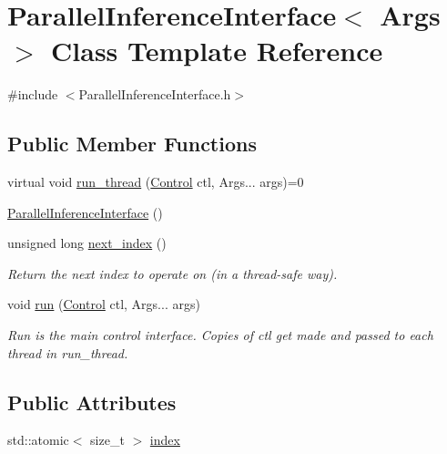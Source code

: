\hypertarget{class_parallel_inference_interface}{}\section{Parallel\+Inference\+Interface$<$ Args $>$ Class Template Reference}
\label{class_parallel_inference_interface}


{\ttfamily \#include $<$Parallel\+Inference\+Interface.\+h$>$}

\subsection*{Public Member Functions}
\begin{DoxyCompactItemize}
\item 
virtual void \hyperlink{class_parallel_inference_interface_a79f626a400fbc11ed530c97f32dfd5c3}{run\+\_\+thread} (\hyperlink{struct_control}{Control} ctl, Args... args)=0
\item 
\hyperlink{class_parallel_inference_interface_a59989833c3d7fde08746087b29c7dcef}{Parallel\+Inference\+Interface} ()
\item 
unsigned long \hyperlink{class_parallel_inference_interface_aaa1fe948131956b21a89c8c267e46b6c}{next\+\_\+index} ()
\begin{DoxyCompactList}\small\item\em Return the next index to operate on (in a thread-\/safe way). \end{DoxyCompactList}\item 
void \hyperlink{class_parallel_inference_interface_a836204d148b8b5187d39e494d926d7b3}{run} (\hyperlink{struct_control}{Control} ctl, Args... args)
\begin{DoxyCompactList}\small\item\em Run is the main control interface. Copies of ctl get made and passed to each thread in run\+\_\+thread. \end{DoxyCompactList}\end{DoxyCompactItemize}
\subsection*{Public Attributes}
\begin{DoxyCompactItemize}
\item 
std\+::atomic$<$ size\+\_\+t $>$ \hyperlink{class_parallel_inference_interface_a1494ba5ab10b5fda9bca6acc39de37cb}{index}
\end{DoxyCompactItemize}



